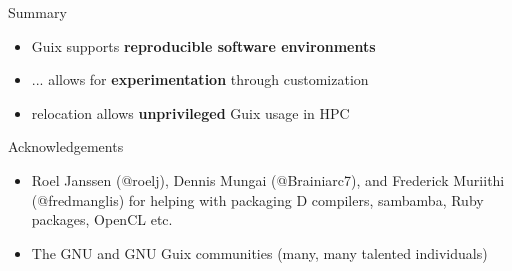 \documentclass{beamer}
\newcommand{\highlight}[1]{\alert{\textbf{#1}}}
\begin{document}
\begin{frame}{Summary}
  \Large{
    \begin{itemize}
    \item Guix supports \highlight{reproducible software environments}
    \item ... allows for \highlight{experimentation} through customization
    \item relocation allows \highlight{unprivileged} Guix usage in HPC
    \end{itemize}
  }
\end{frame}

\begin{frame}{Acknowledgements}
\small
\begin{itemize}
\item Roel Janssen (@roelj), Dennis Mungai (@Brainiarc7), and Frederick Muriithi (@fredmanglis) for helping with packaging D compilers, sambamba, Ruby packages, OpenCL etc.
\item The GNU and GNU Guix communities (many, many talented individuals)
\end{itemize}
\end{frame}

\begin{frame}[plain]

\vfill{
  \vspace{2.5cm}
  \\[1.0cm]
  \\
}
\end{frame}
\end{document}
